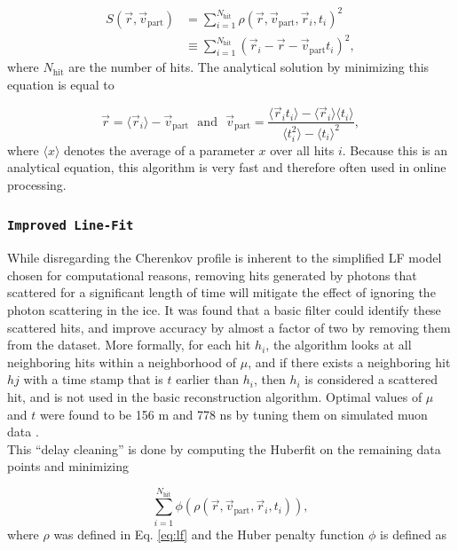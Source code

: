 \begin{equation}
\label{eq:lf}
\begin{split}
S(\vec{r},\vec{v}_{\textrm{part}}) &= \sum^{N_{\textrm{hit}}}_{i=1} \rho(\vec{r},\vec{v}_\textrm{part},\vec{r}_i,t_i)^2\\
&\equiv \sum^{N_{\textrm{hit}}}_{i=1} \left(\vec{r}_i - \vec{r} - \vec{v}_\textrm{part}t_i \right)^2,
\end{split}
\end{equation}
\noindent where $N_\textrm{hit}$ are the number of hits. The analytical solution by minimizing this equation is equal to

\begin{equation}
\vec{r} = \langle\vec{r}_i\rangle - \vec{v}_\textrm{part} \ \ \ \textrm{and}\ \ \ \vec{v}_\textrm{part} = \frac{\langle \vec{r}_i t_i\rangle - \langle \vec{r}_i \rangle \langle t_i \rangle }{\langle t_i^2 \rangle - \langle t_i \rangle^2},
\end{equation}
\noindent where $\langle x \rangle$ denotes the average of a parameter $x$ over all hits $i$. Because this is an analytical equation, this algorithm is very fast and therefore often used in online processing.
 
\subsubsection{\texttt{Improved Line-Fit}}
While disregarding the Cherenkov profile is inherent to the simplified LF model chosen for computational reasons, removing hits generated by photons that scattered for a significant length of time will mitigate the effect of ignoring the photon scattering in the ice. It was found that a basic filter could identify these scattered hits, and improve accuracy by almost a factor of two by removing them from the dataset. More formally, for each hit $h_i$, the algorithm looks at all neighboring hits within a neighborhood of $\mu$, and if there exists a neighboring hit $hj$ with a time stamp that is $t$ earlier than $h_i$, then $h_i$ is considered a scattered hit, and is not used in the basic reconstruction algorithm. Optimal values of $\mu$ and $t$ were found to be 156 m and 778 ns by tuning them on simulated muon data \cite{Aartsen:2013bfa}.\\

\noindent This ``delay cleaning'' is done by computing the Huberfit on the remaining data points and minimizing

\begin{equation}
\sum^{N_{\textrm{hit}}}_{i=1} \phi(\rho(\vec{r},\vec{v}_\textrm{part},\vec{r}_i,t_i)),
\end{equation}
\noindent where $\rho$ was defined in Eq. \ref{eq:lf} and the Huber penalty function $\phi$ is defined as

